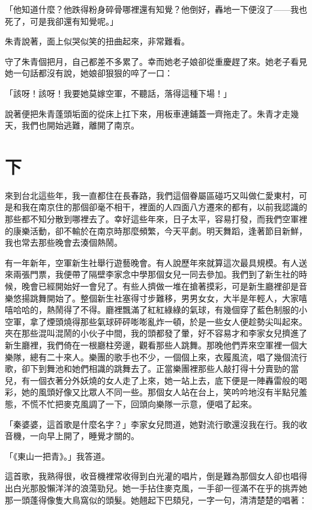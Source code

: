 \documentclass[b5paper,11pt,twoside,twocolumn]{ctexbook}
\begin{document}
「他知道什麼？他跌得粉身碎骨哪裡還有知覺？他倒好，轟地一下便沒了——我也死了，可是我卻還有知覺呢。」

朱青說著，面上似哭似笑的扭曲起來，非常難看。

守了朱青個把月，自己都差不多累了。幸而她老子娘卻從重慶趕了來。她老子看見她一句話都沒有說，她娘卻狠狠的啐了一口：

「該呀！該呀！我要她莫嫁空軍，不聽話，落得這種下場！」

說著便把朱青蓬頭垢面的從床上扛下來，用板車連鋪蓋一齊拖走了。朱青才走幾天，我們也開始逃難，離開了南京。

\chapter{下}

來到台北這些年，我一直都住在長春路，我們這個眷屬區碰巧又叫做仁愛東村，可是和我在南京住的那個卻毫不相干，裡面的人四面八方遷來的都有，以前我認識的那些都不知分散到哪裡去了。幸好這些年來，日子太平，容易打發，而我們空軍裡的康樂活動，卻不輸於在南京時那麼頻繁，今天平劇。明天舞蹈，逢著節目新鮮，我也常去那些晚會去湊個熱鬧。

有一年新年，空軍新生社舉行遊藝晚會。有人說歷年來就算這次最具規模。有人送來兩張門票，我便帶了隔壁李家念中學那個女兒一同去參加。我們到了新生社的時候，晚會已經開始好一會兒了。有些人擠做一堆在搶著摸彩，可是新生廳裡卻是音樂悠揚跳舞開始了。整個新生社塞得寸步難移，男男女女，大半是年輕人，大家嘻嘻哈哈的，熱鬧得了不得。廳裡飄滿了紅紅綠綠的氣球，有幾個穿了藍色制服的小空軍，拿了煙頭燒得那些氣球砰砰嘭嘭亂炸一頓，於是一些女人便趁勢尖叫起來。夾在那些混叫混鬧的小伙子中間，我的頭都發了暈，好不容易才和李家女兒擠進了新生廳裡，我們倚在一根廳柱旁邊，觀看那些人跳舞。那晚他們弄來空軍裡一個大樂隊，總有二十來人。樂團的歌手也不少，一個個上來，衣履風流，唱了幾個流行歌，卻下到舞池和她們相識的跳舞去了。正當樂團裡那些人敲打得十分賣勁的當兒，有一個衣著分外妖燒的女人走了上來，她一站上去，底下便是一陣轟雷般的喝彩，她的風頭好像又比眾人不同一些。那個女人站在台上，笑吟吟地沒有半點兒羞態，不慌不忙把麥克風調了一下，回頭向樂隊一示意，便唱了起來。

「秦婆婆，這首歌是什麼名字？」李家女兒問道，她對流行歌還沒我在行。我的收音機，一向早上開了，睡覺才關的。

「《東山一把青》。」我答道。

這首歌，我熟得很，收音機裡常收得到白光灌的唱片，倒是難為那個女人卻也唱得出白光那股懶洋洋的浪蕩勁兒。她一手拈住麥克風，一手卻一徑滿不在乎的挑弄她那一頭蓬得像隻大鳥窩似的頭髮。她翹起下巴頦兒，一字一句，清清楚楚的唱著：
\end{document}
